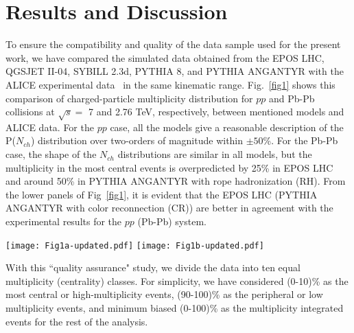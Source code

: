 \documentclass[aps,twocolumn,nofootinbib]{revtex4-1}
\begin{document}
\section{Results and Discussion}
\label{Sec3}

To ensure the compatibility and quality of the data sample used for the present work, we have compared the simulated data obtained from the EPOS LHC, QGSJET II-04, SYBILL 2.3d, PYTHIA 8, and PYTHIA ANGANTYR with the ALICE experimental data~\cite{ALICE:2017pcy,ALICE:2010suc} in the same kinematic range. Fig.~\ref{fig1} shows this comparison of charged-particle multiplicity distribution for $pp$ and Pb-Pb collisions at $\sqrt{s} =$ 7 and 2.76 TeV, respectively, between mentioned models and ALICE data. For the $pp$ case, all the models give a reasonable description of the P($N_{ch}$) distribution over two-orders of magnitude within $\pm 50$\%. For the Pb-Pb case, the shape of the $N_{ch}$ distributions are similar in all models, but the multiplicity in the most central events is overpredicted by 25\% in EPOS LHC and around 50\% in PYTHIA ANGANTYR with rope hadronization (RH). From the lower panels of  Fig~\ref{fig1}, it is evident that the EPOS LHC (PYTHIA ANGANTYR with color reconnection (CR)) are better in agreement with the experimental results for the $pp$ (Pb-Pb) system.\\

\begin{figure*}[!ht]
\texttt{[image: Fig1a-updated.pdf]}
\texttt{[image: Fig1b-updated.pdf]}
\caption {(Color online) Upper left panel: Charged-particle multiplicity distribution for $pp$ collisions at $\sqrt{s} =$ 7 TeV obtained from various models and ALICE experimental data ~\cite{ALICE:2017pcy} Lower left panel: Ratio of simulated data obtained from various models and experimental data~\cite{ALICE:2017pcy}. Upper right panel: Charged-particle multiplicity distribution for Pb-Pb collisions at $\sqrt{s} =$ 2.76 TeV obtained from various models and ALICE experimental data ~\cite{ALICE:2010suc} Lower right panel: Ratio of simulated data obtained from various models and experimental data~\cite{ALICE:2010suc}. The error bars in the data points are the statistical uncertainties.}
\label{fig1}  
\end{figure*} 

With this ``quality assurance" study, we divide the data into ten equal multiplicity (centrality) classes. For simplicity, we have considered (0-10)\% as the most central or high-multiplicity events, (90-100)\% as the peripheral or low multiplicity events, and minimum biased (0-100)\% as the multiplicity integrated events for the rest of the analysis. 
\end{document}
